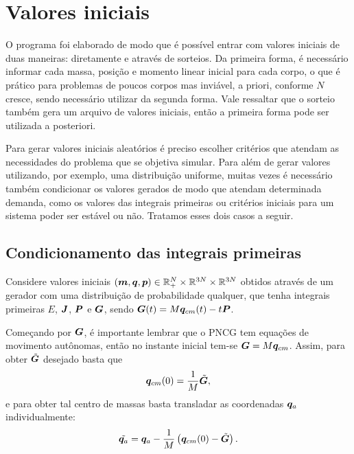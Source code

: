 \section{Valores iniciais}\label{secao:valores_iniciais}

O programa foi elaborado de modo que é possível entrar com valores iniciais de duas maneiras: diretamente e através de sorteios. Da primeira forma, é necessário informar cada massa, posição e momento linear inicial para cada corpo, o que é prático para problemas de poucos corpos mas inviável, a priori, conforme $N$ cresce, sendo necessário utilizar da segunda forma. Vale ressaltar que o sorteio também gera um arquivo de valores iniciais, então a primeira forma pode ser utilizada a posteriori.

Para gerar valores iniciais aleatórios é preciso escolher critérios que atendam as necessidades do problema que se objetiva simular. Para além de gerar valores utilizando, por exemplo, uma distribuição uniforme, muitas vezes é necessário também condicionar os valores gerados de modo que atendam determinada demanda, como os valores das integrais primeiras ou critérios iniciais para um sistema poder ser estável ou não. Tratamos esses dois casos a seguir.

\subsection{Condicionamento das integrais primeiras}
Considere valores iniciais $(\bm m, \bm q, \bm p) \in \mathbb{R}_+^N \times \mathbb{R}^{3N} \times \mathbb{R}^{3N}$ obtidos através de um gerador com uma distribuição de probabilidade qualquer, que tenha integrais primeiras $E$, $\bm J$, $\bm P$ e $\bm G$, sendo $\bm G(t) = M \bm q_{cm} (t) - t \bm P$.

Começando por $\bm G$, é importante lembrar que o PNCG tem equações de movimento autônomas, então no instante inicial tem-se $\bm G = M \bm q_{cm}$. Assim, para obter $\tilde{\bm G}$ desejado basta que
\begin{equation*}
    \bm q_{cm}(0) = \dfrac{1}{M} \tilde{\bm G},
\end{equation*}
e para obter tal centro de massas basta transladar as coordenadas $\bm q_a$ individualmente:
\begin{equation*}
    \tilde{\bm q_a} = \bm q_a - \dfrac{1}{M} \left(\bm q_{cm}(0) - \tilde{\bm G}\right).
\end{equation*}

